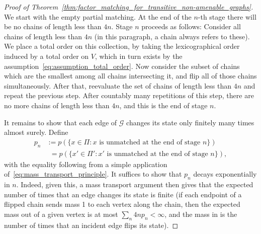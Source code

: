 \documentclass[11pt, reqno]{article}
\numberwithin{equation}{section}
\theoremstyle{definition}
\def\cG{\mathcal{G}}
\newcommand{\1}{\mathds{1}}
\begin{document}
\begin{proof}[Proof of Theorem~\ref{thm:factor_matching_for_transitive_non-amenable_graphs}]

    We start with the empty partial matching. At the end of the $n$-th stage there will be no chains of length less than $4n$. Stage $n$ proceeds as follows: Consider all chains of length less than $4n$ (in this paragraph, a chain always refers to these). We place a total order on this collection, by taking the lexicographical order induced by a total order on $V$, which in turn exists by the assumption~\eqref{eq:assumption_total_order}.
    Now consider the subset of chains which are the smallest among all chains intersecting it, and flip all of those chains simultaneously. After that, reevaluate the set of chains of length less than $4n$ and repeat the previous step. After countably many repetitions of this step, there are no more chains of length less than $4n$, and this is the end of stage $n$.

    It remains to show that each edge of $\cG$ changes its state only finitely many times almost surely. Define
    \begin{align*}
     p_n &:= p(\{ x \in \Pi : x\text{ is unmatched at the end of stage }n\}) \\
         &\phantom{:}= p(\{ x' \in \Pi' : x'\text{ is unmatched at the end of stage }n\}) ,
    \end{align*}
    with the equality following from a simple application of~\eqref{eq:mass_transport_principle}.
    It suffices to show that $p_n$ decays exponentially in $n$.
    Indeed, given this, a mass transport argument then gives that the expected number of times that an edge changes its state is finite (if each endpoint of a flipped chain sends mass 1 to each vertex along the chain, then the expected mass out of a given vertex is at most $\sum_n 4n p_n < \infty$, and the mass in is the number of times that an incident edge flips its state).


\end{proof}
\end{document}
